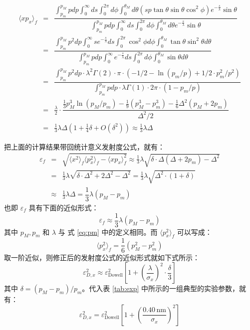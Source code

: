 \begin{eqnarray*}
\langle xp_x\rangle_f &=& \dfrac{\int_{p_m}^{p_M} pdp\int_0^{\infty} ds\int_0^{2\pi}d\phi\int_0^{\theta_M}d\theta (sp\tan\theta\sin\theta\cos^2\phi)e^{-\frac{s}{\lambda}}\sin\theta}{\int_{p_m}^{p_M} pdp\int_0^{\infty} ds\int_0^{2\pi}d\phi\int_0^{\theta_M}d\theta e^{-\frac{s}{\lambda}}\sin\theta}\\
&=& \dfrac{\int_{p_m}^{p_M} p^2dp\int_0^{\infty} se^{-\frac{s}{\lambda}}ds\int_0^{2\pi}\cos^2\phi d\phi\int_0^{\theta_M}\tan\theta\sin^2\theta d\theta}{\int_{p_m}^{p_M} pdp\int_0^{\infty} e^{-\frac{s}{\lambda}}ds\int_0^{2\pi}d\phi\int_0^{\theta_M}\sin\theta d\theta}\\
&=& \dfrac{\int_{p_m}^{p_M}p^2dp\cdot\lambda^2\Gamma(2)\cdot\pi\cdot(-1/2-\ln(p_m/p)+1/2\cdot p_m^2/p^2)}{\int_{p_m}^{p_M}pdp\cdot\lambda\Gamma(1)\cdot2\pi\cdot(1-p_m/p)}\\
&=& \frac{\lambda}{2}\cdot\dfrac{\frac{1}{3}p_M^3\ln(p_M/p_m)-\frac{1}{9}(p_M^3-p_m^3)-\frac{1}{6}\Delta^2(p_M+2p_m)}{\Delta^2/2}\\
&=& \frac{1}{3}\lambda \Delta\left(1+\frac{1}{4}\delta+O(\delta^2)\right)\approx\frac{1}{3}\lambda \Delta
\end{eqnarray*}

把上面的计算结果带回统计意义发射度公式，就有：
\begin{eqnarray*}
\varepsilon_f &=& \sqrt{\langle x^2\rangle_f\langle p_x^2\rangle_f-\langle xp_x\rangle_f^2} \approx \frac{1}{3}\lambda\sqrt{\delta\cdot\Delta(\Delta+2p_m)-\Delta^2}\\
&=& \frac{1}{3}\lambda\sqrt{\delta\cdot\Delta^2+2\Delta^2-\Delta^2} = \frac{1}{3}\lambda\sqrt{\Delta^2\cdot(1+\delta)}\\
&\approx& \frac{1}{3}\lambda\Delta = \dfrac{1}{3}\lambda(p_M-p_m)
\end{eqnarray*}
也即 $\varepsilon_f$ 具有下面的近似形式：
\[
\varepsilon_f \approx \dfrac{1}{3}\lambda(p_M-p_m)
\]
其中 $p_M,p_m$ 和 $\lambda$ 与 式 \ref{eq:pm} 中的定义相同。而 $\langle p_x^2\rangle_f$ 可以写成：
\[
\langle p_x^2\rangle_f = \dfrac{1}{6}(p_M^2-p_m^2)
\]
取一阶近似，则修正后的发射度公式的近似形式就如下式所示：
\begin{equation}
\varepsilon_{D,x}^2 \approx \varepsilon_{\text{Dowell}}^2\left[1+\left(\dfrac{\lambda}{\sigma_x}\right)^2\cdot\dfrac{\delta}{3}\right]
\label{eq:emit_de}
\end{equation}
其中 $\delta = (p_M-p_m)/p_m$。代入表 \ref{tab:exp} 中所示的一组典型的实验参数，就有：
\[
\varepsilon_{D,x}^2 = \varepsilon_{\text{Dowell}}^2\left[1+\left(\dfrac{0.40\,\text{nm}}{\sigma_x}\right)^2\right]
\]

